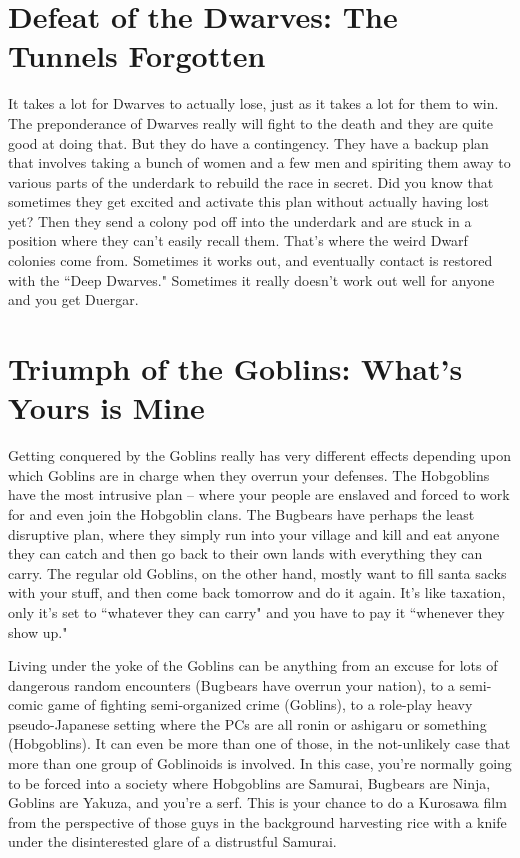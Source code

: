 \section{Defeat of the Dwarves: The Tunnels Forgotten}

It takes a lot for Dwarves to actually lose, just as it takes a lot for them to win. The preponderance of Dwarves really will fight to the death and they are quite good at doing that. But they do have a contingency. They have a backup plan that involves taking a bunch of women and a few men and spiriting them away to various parts of the underdark to rebuild the race in secret. Did you know that sometimes they get excited and activate this plan without actually having lost yet? Then they send a colony pod off into the underdark and are stuck in a position where they can't easily recall them. That's where the weird Dwarf colonies come from. Sometimes it works out, and eventually contact is restored with the ``Deep Dwarves." Sometimes it really doesn't work out well for anyone and you get Duergar.

\section{Triumph of the Goblins: What's Yours is Mine}

Getting conquered by the Goblins really has very different effects depending upon which Goblins are in charge when they overrun your defenses. The Hobgoblins have the most intrusive plan -- where your people are enslaved and forced to work for and even join the Hobgoblin clans. The Bugbears have perhaps the least disruptive plan, where they simply run into your village and kill and eat anyone they can catch and then go back to their own lands with everything they can carry. The regular old Goblins, on the other hand, mostly want to fill santa sacks with your stuff, and then come back tomorrow and do it again. It's like taxation, only it's set to ``whatever they can carry" and you have to pay it ``whenever they show up."

Living under the yoke of the Goblins can be anything from an excuse for lots of dangerous random encounters (Bugbears have overrun your nation), to a semi-comic game of fighting semi-organized crime (Goblins), to a role-play heavy pseudo-Japanese setting where the PCs are all ronin or ashigaru or something (Hobgoblins). It can even be more than one of those, in the not-unlikely case that more than one group of Goblinoids is involved. In this case, you're normally going to be forced into a society where Hobgoblins are Samurai, Bugbears are Ninja, Goblins are Yakuza, and you're a serf. This is your chance to do a Kurosawa film from the perspective of those guys in the background harvesting rice with a knife under the disinterested glare of a distrustful Samurai.

